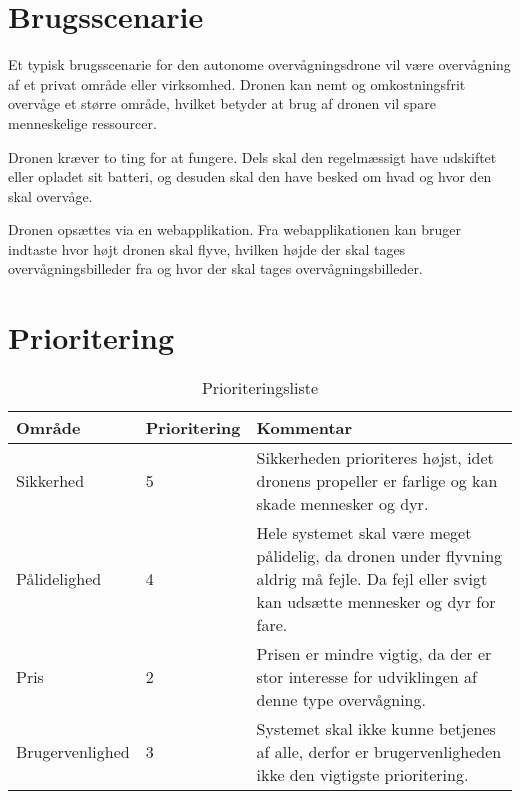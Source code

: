 \section{Brugsscenarie}

Et typisk brugsscenarie for den autonome overvågningsdrone vil være overvågning af et privat område eller virksomhed. Dronen kan nemt og omkostningsfrit overvåge et større område, hvilket betyder at brug af dronen vil spare menneskelige ressourcer. 

Dronen kræver to ting for at fungere. Dels skal den regelmæssigt have udskiftet eller opladet sit batteri, og desuden skal den have besked om hvad og hvor den skal overvåge.

Dronen opsættes via en webapplikation. Fra webapplikationen kan bruger indtaste hvor højt dronen skal flyve, hvilken højde der skal tages overvågningsbilleder fra og hvor der skal tages overvågningsbilleder.



\section{Prioritering}

\begin{table}[H]
	\centering
		\begin{tabular}{|l|l|p{9 cm}|} 
		\hline
			Område & Prioritering & Kommentar \\ \hline
			Sikkerhed 		& 5 	& Sikkerheden prioriteres højst, idet dronens propeller er farlige og kan skade mennesker og dyr.   \\ \hline
			
			Pålidelighed 	& 4 	& Hele systemet skal være meget pålidelig, da dronen under flyvning aldrig må fejle. Da fejl eller svigt kan udsætte mennesker og dyr for fare.  \\ \hline
			
			Pris 			& 2 	& Prisen er mindre vigtig, da der er stor interesse for udviklingen af denne type overvågning.    \\ \hline
			
			Brugervenlighed & 3 	& Systemet skal ikke kunne betjenes af alle, derfor er brugervenligheden ikke den vigtigste prioritering. \\ \hline
		\end{tabular}
	\caption{Prioriteringsliste}
\end{table}
